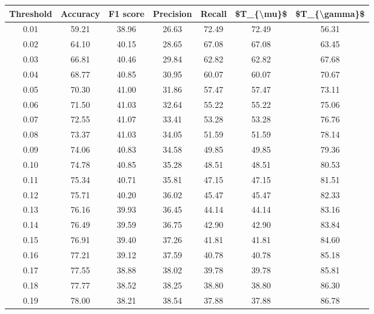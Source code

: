 \begin{tabular}{|c|c|c|c|c|c|c|}
\hline
 Threshold &  Accuracy &  F1 score &  Precision &  Recall &  \$T\_\{\textbackslash mu\}\$ &  \$T\_\{\textbackslash gamma\}\$ \\
\hline
      0.01 &     59.21 &     38.96 &      26.63 &   72.49 &      72.49 &         56.31 \\
      0.02 &     64.10 &     40.15 &      28.65 &   67.08 &      67.08 &         63.45 \\
      0.03 &     66.81 &     40.46 &      29.84 &   62.82 &      62.82 &         67.68 \\
      0.04 &     68.77 &     40.85 &      30.95 &   60.07 &      60.07 &         70.67 \\
      0.05 &     70.30 &     41.00 &      31.86 &   57.47 &      57.47 &         73.11 \\
      0.06 &     71.50 &     41.03 &      32.64 &   55.22 &      55.22 &         75.06 \\
      0.07 &     72.55 &     41.07 &      33.41 &   53.28 &      53.28 &         76.76 \\
      0.08 &     73.37 &     41.03 &      34.05 &   51.59 &      51.59 &         78.14 \\
      0.09 &     74.06 &     40.83 &      34.58 &   49.85 &      49.85 &         79.36 \\
      0.10 &     74.78 &     40.85 &      35.28 &   48.51 &      48.51 &         80.53 \\
      0.11 &     75.34 &     40.71 &      35.81 &   47.15 &      47.15 &         81.51 \\
      0.12 &     75.71 &     40.20 &      36.02 &   45.47 &      45.47 &         82.33 \\
      0.13 &     76.16 &     39.93 &      36.45 &   44.14 &      44.14 &         83.16 \\
      0.14 &     76.49 &     39.59 &      36.75 &   42.90 &      42.90 &         83.84 \\
      0.15 &     76.91 &     39.40 &      37.26 &   41.81 &      41.81 &         84.60 \\
      0.16 &     77.21 &     39.12 &      37.59 &   40.78 &      40.78 &         85.18 \\
      0.17 &     77.55 &     38.88 &      38.02 &   39.78 &      39.78 &         85.81 \\
      0.18 &     77.77 &     38.52 &      38.25 &   38.80 &      38.80 &         86.30 \\
      0.19 &     78.00 &     38.21 &      38.54 &   37.88 &      37.88 &         86.78 \\

\end{tabular}
